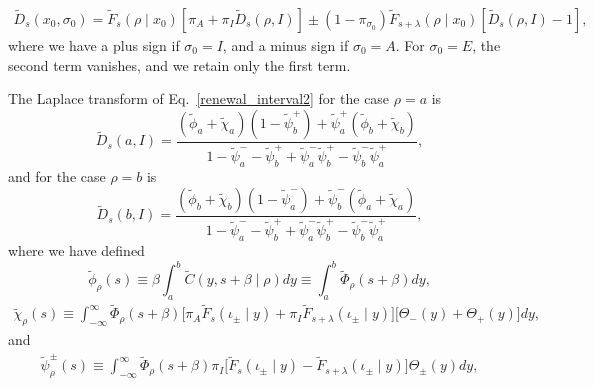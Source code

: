 \begin{align}
\widetilde{D}_s(x_0,\sigma_{0})=
\widetilde{F}_s(\rho\mid x_0)\left[\pi_{A} + \pi_{I}\widetilde{D}_s(\rho,I)\right] 
\pm (1-\pi_{\sigma_{0}})\widetilde{F}_{s+\lambda}(\rho\mid x_0)\left[ \widetilde{D}_s(\rho,I) -1 \right], \label{distribution_1}
\end{align}
%
where we have a plus sign if $\sigma_0=I$, and a minus sign if $\sigma_0=A$. For $\sigma_0=E$, the second term vanishes, and we retain only the first term.

 
The Laplace transform of Eq.~\eqref{renewal_interval2} for the case $\rho=a$ is
%
\begin{equation} \label{distribution_2}
\widetilde{D}_s(a,I)    = 
\frac{(\widetilde{\phi}_a + \widetilde{\chi}_a)(1- \widetilde{\psi}^{+}_{b}) +  \widetilde{\psi}^{+}_{a} (\widetilde{\phi}_b + \widetilde{\chi}_b)}{1 - \widetilde{\psi}^{-}_{a} -\widetilde{\psi}^{+}_{b} + \widetilde{\psi}^{-}_{a}\widetilde{\psi}^{+}_{b}  - \widetilde{\psi}^{-}_{b}\widetilde{\psi}^{+}_{a} } , 
\end{equation}
%
and for the case $\rho=b$ is
%
\begin{equation} \label{distribution_3}
 \widetilde{D}_s(b,I)    = 
\frac{ (\widetilde{\phi}_b + \widetilde{\chi}_b)(1- \widetilde{\psi}^{-}_{a})  + \widetilde{\psi}^{-}_{b}(\widetilde{\phi}_a + \widetilde{\chi}_a)  }{1 - \widetilde{\psi}^{-}_{a} -\widetilde{\psi}^{+}_{b} + \widetilde{\psi}^{-}_{a}\widetilde{\psi}^{+}_{b}  - \widetilde{\psi}^{-}_{b}\widetilde{\psi}^{+}_{a} } ,
\end{equation}
%
where we have defined
%
\begin{equation} \label{defined_1}
 \widetilde{\phi}_\rho(s) \equiv  \beta\int^{b}_{a}\widetilde{C}(y,s+\beta\mid \rho) dy \equiv  \int^{b}_{a} \widetilde{\Phi}_{\rho}(s+\beta) dy, 
\end{equation}
%
\begin{align} \label{defined_2}
\widetilde{\chi}_\rho(s) \equiv \int^{\infty}_{-\infty} \widetilde{\Phi}_{\rho}(s+\beta)  \Big[\pi_{A}\widetilde{F}_s(\iota_{\pm} \mid y) + \pi_{I}\widetilde{F}_{s+\lambda}(\iota_{\pm} \mid y) \Big] 
 \Big[\Theta_{-}(y)+\Theta_{+}(y)\Big]dy ,  
\end{align}
%
\noindent and
%
\begin{align} \label{defined_3}
\widetilde{\psi}^{\pm}_{\rho}(s)  \equiv  \int^{\infty}_{-\infty} \widetilde{\Phi}_{\rho}(s+\beta)  \pi_{I} \Big[ \widetilde{F}_s(\iota_\pm \mid y) - \widetilde{F}_{s+\lambda}(\iota_\pm \mid y) \Big]  \Theta_{\pm}(y)dy, 
\end{align}
